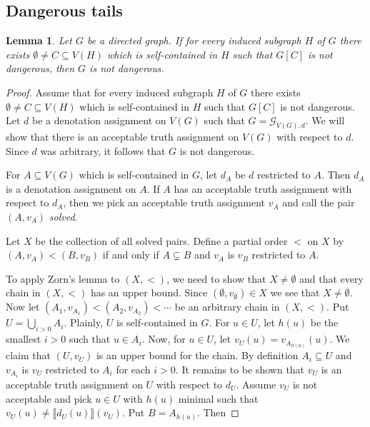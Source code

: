 \documentclass[12pt]{kluwer}
\newtheorem{lem}[thm]{Lemma}
\theoremstyle{remark}
\newcommand{\fancy}[1]{\mathcal{#1}}
\def\G{\fancy{G}}
\begin{document}
\subsection{Dangerous tails}
\begin{lem}\label{GeneralZorn}
Let $G$ be a directed graph. If for every induced subgraph $H$ of $G$ there exists $\emptyset \neq C \subseteq V(H)$ which is self-contained in $H$ such that $G[C]$ is not dangerous, then $G$ is not dangerous.
\end{lem}
\begin{proof}
Assume that for every induced subgraph $H$ of $G$ there exists $\emptyset \neq C \subseteq V(H)$ which is self-contained in $H$ such that $G[C]$ is not dangerous.  Let $d$ be a denotation assignment on $V(G)$ such that $G = \G_{V(G), d}$. We will show that there is an acceptable truth assignment on $V(G)$ with respect to $d$.  Since $d$ was arbitrary, it follows that $G$ is not dangerous.\newline

For $A \subseteq V(G)$ which is self-contained in $G$, let $d_A$ be $d$ restricted to $A$.  Then $d_A$ is a denotation assignment on $A$.  If $A$ has an  acceptable truth assignment with respect to $d_A$, then we pick an acceptable truth assignment $v_A$ and call the pair $(A, v_A)$ \emph{solved}.\newline

Let $X$ be the collection of all solved pairs.  Define a partial order $<$ on $X$ by $(A, v_A) < (B, v_B)$ if and only if $A \subsetneq B$ and $v_A$ is $v_B$ restricted to $A$.\newline

To apply Zorn's lemma to $(X, <)$, we need to show that $X \neq \emptyset$ and that every chain in  $(X, <)$ has an upper bound. Since $(\emptyset, v_\emptyset) \in X$ we see that $X \neq \emptyset$.  Now let $(A_1, v_{A_1}) < (A_2, v_{A_2}) < \cdots$ be an arbitrary chain in $(X, <)$.  Put $U = \bigcup_{i > 0} A_i$. Plainly, $U$ is self-contained in $G$. For $u \in U$, let $h(u)$ be the smallest $i > 0$ such that $u \in A_i$.  Now, for $u \in U$, let $v_U(u) = v_{A_{h(u)}}(u)$.  We claim that $(U, v_U)$ is an upper bound for the chain.  By definition $A_i \subseteq U$ and $v_{A_i}$ is $v_U$ restricted to $A_i$ for each $i > 0$.  It remains to be shown that $v_U$ is an acceptable truth assignment on $U$ with respect to $d_U$.  Assume $v_U$ is not acceptable and pick $u \in U$ with $h(u)$ minimal such that $v_U(u) \neq \llbracket d_U(u)\rrbracket(v_U)$.  Put $B = A_{h(u)}$. Then


\end{proof}
\end{document}

